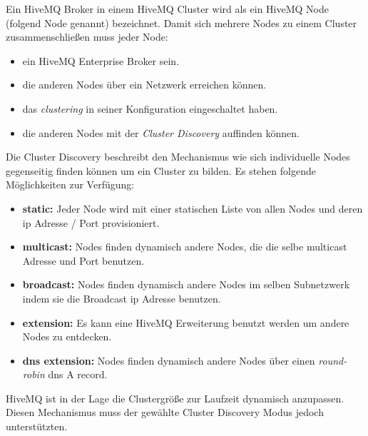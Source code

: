 Ein HiveMQ Broker in einem HiveMQ Cluster wird als ein HiveMQ Node (folgend Node genannt) bezeichnet.
Damit sich mehrere Nodes zu einem Cluster zusammenschlie{\ss}en muss jeder Node:
\begin{itemize}
    \item ein HiveMQ Enterprise Broker sein.
    \item die anderen Nodes über ein Netzwerk erreichen können.
    \item das \textit{clustering} in seiner Konfiguration eingeschaltet haben.
    \item die anderen Nodes mit der \textit{Cluster Discovery} auffinden können.
\end{itemize}
Die Cluster Discovery beschreibt den Mechanismus wie sich individuelle Nodes gegenseitig finden können um ein Cluster zu bilden. Es stehen folgende Möglichkeiten zur Verfügung:
\begin{itemize}
    \item \textbf{static:} Jeder Node wird mit einer statischen Liste von allen Nodes und deren \ac{ip} Adresse / Port provisioniert.
    \item \textbf{multicast:} Nodes finden dynamisch andere Nodes, die die selbe multicast Adresse und Port benutzen.
    \item \textbf{broadcast:} Nodes finden dynamisch andere Nodes im selben Subnetzwerk indem sie die Broadcast \ac{ip} Adresse benutzen.
    \item \textbf{extension:} Es kann eine HiveMQ Erweiterung benutzt werden um andere Nodes zu entdecken.
    \item \textbf{dns extension:} Nodes finden dynamisch andere Nodes über einen \textit{round-robin} \acs{dns} A record.
\end{itemize}
HiveMQ ist in der Lage die Clustergrö{\ss}e zur Laufzeit dynamisch anzupassen. Diesen Mechanismus muss der gewählte Cluster Discovery Modus jedoch unterstützten.
\cite{HiveMQClusterHiveMQ}


